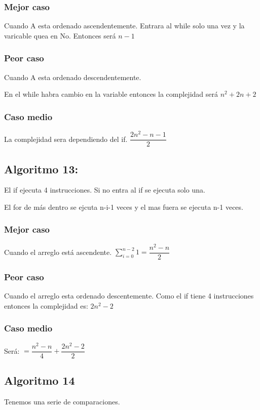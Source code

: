 \documentclass[12pt, fleqn]{article}                             %
\theoremstyle{break}                                            %
\begin{document}
    \subsubsection{Mejor caso}
    Cuando A esta ordenado ascendentemente.
    Entrara al while solo una vez y la varicable quea en No. Entonces será $n-1$

    \subsubsection{Peor caso}
    Cuando A esta ordenado descendentemente.

    En el while habra cambio en la variable entonces la complejidad será $n^{2}+2n+2$

    \subsubsection{Caso medio}
    La complejidad sera dependiendo del if.
    $\dfrac{2n^2-n-1}{2}$

    \subsection{Algoritmo 13:}
    
    El if ejecuta 4 instrucciones.
    Si no entra al if se ejecuta solo una.

    El for de más dentro se ejcuta n-i-1 veces y el mas fuera se ejecuta n-1 veces.

    \subsubsection{Mejor caso}
    Cuando el arreglo está ascendente.
    $\sum_{i=0}^{n-2} 1 = \dfrac{n^{2}-n}{2}$

    \subsubsection{Peor caso}
    Cuando el arreglo esta ordenado descentemente. Como el if tiene 4 instrucciones entonces la complejidad es: $2n^2 -2$

    \subsubsection{Caso medio}
    Será: $=\dfrac{n^2-n}{4}+\dfrac{2n^2-2}{2}$

    \subsection{Algoritmo 14}
    
    Tenemos una serie de comparaciones.
\end{document}
